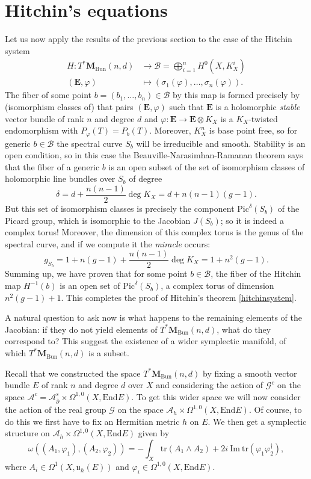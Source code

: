 \documentclass[12pt,a4paper]{book}
\theoremstyle{definition} \newtheorem{defn}[thm]{Definition}
\theoremstyle{definition} \newtheorem{ejemplo}[thm]{Example}
\theoremstyle{remark} \newtheorem{rem}[thm]{Remark}
\def\AA{\mathscr{A}}
\def\BB{\mathscr{B}}
\def\GG{\mathscr{G}}
\def\tr{\mathrm{tr}}
\def\End{\mathrm{End}}
\def\Bun{\mathbf{M}_{\mathrm{Bun}}}
\def\Pic{\mathrm{Pic}}
\def\delbar{\bar{\partial}}
\newcommand{\ve}[1]{\mathbf{#1}}
\begin{document}
	\section{Hitchin's equations}
	Let us now apply the results of the previous section to the case of the Hitchin system
	\begin{align*}
	  H:T^*\Bun(n,d)& \longrightarrow \BB = \bigoplus_{i=1}^n H^0(X,K_X^i) \\
	  (\ve{E},\varphi) &\longmapsto (\sigma_1(\varphi),\dots,\sigma_n(\varphi)). 
	  \end{align*}
	  The fiber of some point $b=(b_1,\dots,b_n)\in \BB$ by this map is formed precisely by (isomorphism classes of) that pairs $(\ve{E},\varphi)$ such that $\ve{E}$ is a holomorphic \textit{stable} vector bundle of rank $n$ and degree $d$ and $\varphi:\ve{E}\rightarrow \ve{E}\otimes K_X$ is a $K_X$-twisted endomorphism with $P_\varphi(T)=P_b(T)$. Moreover, $K_X^n$ is base point free, so for generic $b\in \BB$ the spectral curve $S_b$ will be irreducible and smooth. Stability is an open condition, so in this case the Beauville-Narasimhan-Ramanan theorem says that the fiber of a generic $b$ is an open subset of the set of isomorphism classes of holomorphic line bundles over $S_b$ of degree 
	  $$\delta=d+\frac{n(n-1)}{2}\deg K_X=d+n(n-1)(g-1).$$
	  But this set of isomorphism classes is precisely the component $\Pic^\delta (S_b)$ of the Picard group, which is isomorphic to the Jacobian $J(S_b)$; so it is indeed a complex torus! Moreover, the dimension of this complex torus is the genus of the spectral curve, and if we compute it the \textit{miracle} occurs:
	  \begin{equation*}
	    g_{S_b}=1+n(g-1)+\frac{n(n-1)}{2}\deg K_X=1+n^2(g-1).
	  \end{equation*}
	  Summing up, we have proven that for some point $b\in \BB$, the fiber of the Hitchin map $H^{-1}(b)$ is an open set of $\Pic^{\delta}(S_b)$, a complex torus of dimension $n^2(g-1)+1$. This completes the proof of Hitchin's theorem \ref{hitchinsystem}.

	  A natural question to ask now is what happens to the remaining elements of the Jacobian: if they do not yield elements of $T^*\Bun(n,d)$, what do they correspond to? This suggest the existence of a wider symplectic manifold, of which $T^*\Bun(n,d)$ is a subset. 

	  Recall that we constructed the space $T^*\Bun(n,d)$ by fixing a smooth vector bundle $E$ of rank $n$ and degree $d$ over $X$ and considering the action of $\GG^c$ on the space $\AA^c=\AA_{\delbar}^s \times \Omega^{1,0}(X,\End E)$. To get this wider space we will now consider the action of the real group $\GG$ on the space $\AA_h \times \Omega^{1,0}(X,\End E)$. Of course, to do this we first have to fix an Hermitian metric $h$ on $E$. We then get a symplectic structure on $\AA_h \times \Omega^{1,0}(X,\End E)$ given by
	  \begin{equation*}
	    \omega\left( (A_1,\varphi_1),(A_2,\varphi_2) \right)=-\int_X \tr(A_1\wedge A_2) +2i\ \mathrm{Im}\ \tr(\varphi_1 \varphi_2^\dagger),
	  \end{equation*}
	  where $A_i \in \Omega^{1}(X,\mathfrak{u}_h(E))$ and $\varphi_i \in \Omega^{1,0}(X,\End E)$.
\end{document}
